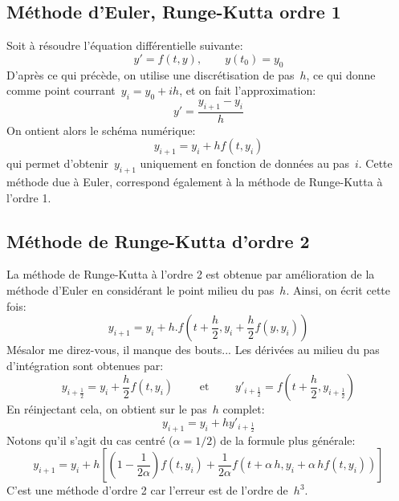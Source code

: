 \subsection{Méthode d'Euler, Runge-Kutta ordre 1} Soit à résoudre l'équation différentielle suivante:
\begin{equation}
y' = f(t, y), \qquad y(t_0) = y_0
\end{equation}
D'après ce qui précède, on utilise une discrétisation de pas~$h$, ce qui donne comme point courrant~$y_i=y_0+ih$, et on fait l'approximation:
\begin{equation} 
y'=\frac{y_{i+1}-y_i}h
\end{equation}
On ontient alors le schéma numérique:
\begin{equation}
y_{i+1}=y_i+hf(t,y_i)
\end{equation}
qui permet d'obtenir~$y_{i+1}$ uniquement en fonction de données au pas~$i$. Cette méthode due à Euler, correspond également à la méthode de Runge-Kutta à l'ordre 1. 
 
\subsection{Méthode de Runge-Kutta d'ordre 2} La méthode de Runge-Kutta à l'ordre 2 est obtenue par amélioration de la méthode d'Euler en considérant le point milieu du pas~$h$. Ainsi, on écrit cette fois:
\begin{equation}
y_{i+1}=y_i+h.f\left(t+\frac{h}2,y_i+\frac{h}2f(y,y_i)\right)
\end{equation}
Mésalor me direz-vous, il manque des bouts... Les dérivées au milieu du pas d'intégration sont obtenues par:
\begin{equation}
y_{i+\frac{1}{2}} = y_i + \frac{h}{2} f \left( t, y_i \right) \qquad \text{ et } \qquad y'_{i+\frac{1}{2}} = f \left( t + \frac{h}{2}, y_{i+\frac{1}{2}} \right)
\end{equation}
En réinjectant cela, on obtient sur le pas~$h$ complet:
\begin{equation}
y_{i+1} = y_i + h y'_{i+\frac{1}{2}}
\end{equation}
Notons qu'il s'agit du cas centré ($\alpha=1/2$) de la formule plus générale:
\begin{equation}
y_{i+1} = y_i + h\left[\left(1-\frac1{2\alpha}\right)f \left( t, y_i \right) + \frac1{2\alpha}f \left( t + \alpha\,h, y_i + \alpha\,h f \left( t, y_i \right) \right)\right]
\end{equation}
C'est une méthode d'ordre 2 car l'erreur est de l'ordre de~$h^3$. 
